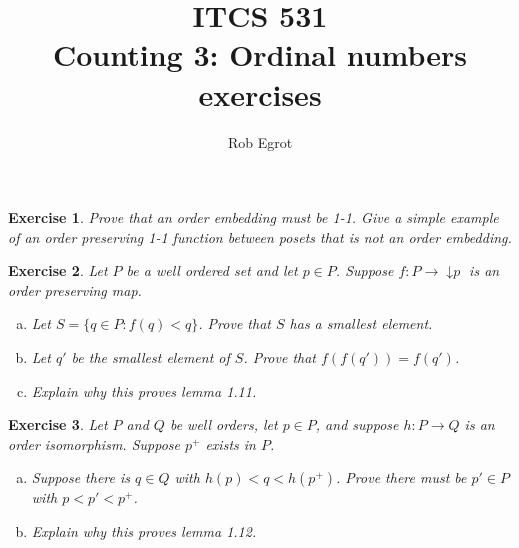 \documentclass{article}
\title{ITCS 531 \\Counting 3: Ordinal numbers exercises}
\author{Rob Egrot}
\date{}
\theoremstyle{plain}
\newtheorem{Q}{Exercise}{\bfseries}{\upshape}
\DeclareMathOperator{\ISp}{\downarrow \mathit{p}}
\begin{document}
\maketitle

\begin{Q}\label{Q:injective}
Prove that an order embedding must be 1-1. Give a simple example of an order preserving 1-1 function between posets that is not an order embedding.
\end{Q} 
\begin{comment}
\textbf{Solution:}

\end{comment} 

\begin{Q}\label{Q:init}
Let $P$ be a well ordered set and let $p\in P$. Suppose $f:P\to \ISp$ is an order preserving map.
\begin{enumerate}[(a)]
\item Let $S=\{q\in P: f(q)< q\}$. Prove that $S$ has a smallest element.
\item Let $q'$ be the smallest element of $S$. Prove that $f(f(q')) = f(q')$.
\item Explain why this proves lemma 1.11.
\end{enumerate} 
\end{Q}
\begin{comment}
\textbf{Solution:}
Let $f:P\to \ISp$ be an order preserving map. Let $S=\{q\in P: f(q)< q\}$. Then $S$ is non-empty as it must contain $p$, so, as $P$ is well ordered, $S$ has a least element, $q'$ say. Since $f(q')<q$, we have $f(q')\notin S$, and so $f(f(q'))\not< f(q')$. But, as $f$ is order preserving we have $f(f(q'))\leq f(q')$, and thus $f(f(q'))= f(q')$. Thus $f$ is not 1-1, and so cannot be an order embedding.
\end{comment}

\begin{Q}\label{Q:successor}
Let $P$ and $Q$ be well orders, let $p\in P$, and suppose $h:P\to Q$ is an order isomorphism. Suppose $p^+$ exists in $P$.
\begin{enumerate}[(a)]
\item Suppose there is $q\in Q$ with $h(p)<q<h(p^+)$. Prove there must be $p'\in P$ with $p<p'<p^+$.
\item Explain why this proves lemma 1.12.
\end{enumerate}
\end{Q}
\begin{comment}
\textbf{Solution:}
Suppose $p$ is not the greatest element of $P$. Then $p^+$ exists. Suppose there is $q\in Q$ with $h(p)< q < h(p^+)$. Then there is $p'\in P$ with $h(p')= q$. But as $h(p)< q$ we must have $p < p'$, and as $q < h(p^+)$ we must have $p' < p^+$. So $p< p' < p^+$. But this contradicts the definition of $p^+$. 
\end{comment}
\end{document}
